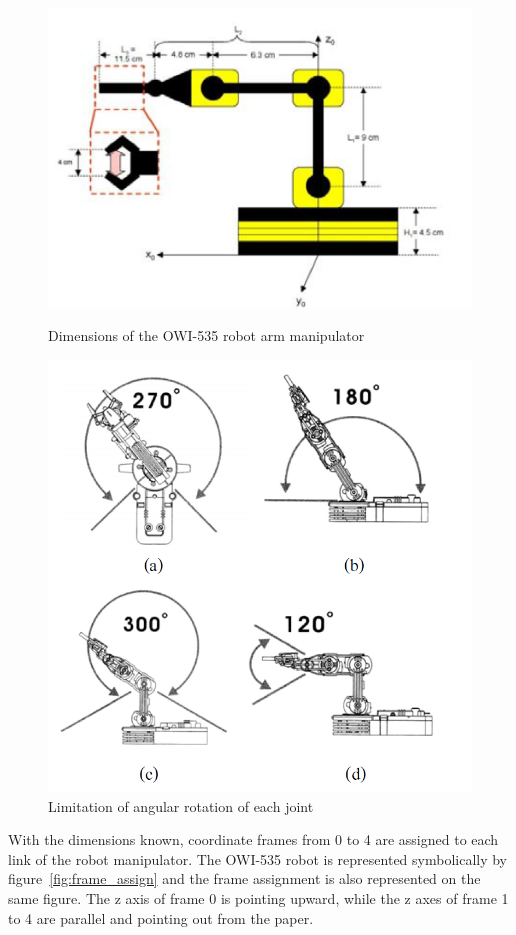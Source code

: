 \documentclass[paper=letter, fontsize=10pt]{scrartcl}	%
\numberwithin{equation}{section}															%
\numberwithin{figure}{section}																%
\numberwithin{table}{section}																%
\begin{document}
\begin{figure}[!h]
\centering
  \begin{minipage}{.5\textwidth}
    \centering
    \includegraphics[width=.8\linewidth]{./Images/OWIDIM}
    \caption{Dimensions of the OWI-535 robot arm manipulator\cite{Pradya}}
    \label{fig:OWIDIM}
  \end{minipage}%
\begin{minipage}{.5\textwidth}
\centering
  \includegraphics[width=.8\linewidth]{./Images/OWI_LIMITS}
  \caption{Limitation of angular rotation of each joint\cite{Pradya}}
  \label{fig:OWI_LIMITS}
\end{minipage} 
\end{figure}

With the dimensions known, coordinate frames from 0 to 4 are assigned to each link of the robot manipulator. The OWI-535 robot is represented symbolically by figure~\ref{fig:frame_assign} and the frame assignment is also represented on the same figure. The z axis of frame 0 is pointing upward, while the z axes of frame 1 to 4 are parallel and pointing out from the paper. 
\end{document}
